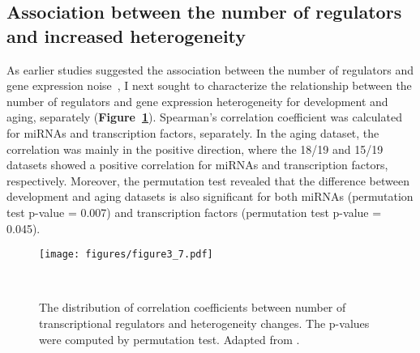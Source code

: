 \subsection{Association between the number of regulators and increased heterogeneity}
As earlier studies suggested the association between the number of regulators and gene expression noise~\autocite{Barroso2018, Sharon2014}, 
I next sought to characterize the relationship between the number of regulators and gene expression heterogeneity for development and aging, separately (\textbf{Figure~\ref{fig:fig3.7}}).
Spearman's correlation coefficient was calculated for miRNAs and transcription factors, separately.
In the aging dataset, the correlation was mainly in the positive direction, where the 18/19 and 15/19 datasets showed a positive correlation for miRNAs and transcription factors, respectively.
Moreover, the permutation test revealed that the difference between development and aging datasets is also significant 
for both miRNAs (permutation test p-value = 0.007) and transcription factors (permutation test p-value = 0.045).

\begin{figure}[!ht]
    \centering
    \texttt{[image: figures/figure3\_7.pdf]}
    \caption{The distribution of correlation coefficients between number of transcriptional regulators and heterogeneity changes. 
    The p-values were computed by permutation test.
    Adapted from \autocite{Isildak2020}.
    }~\label{fig:fig3.7}
\end{figure}